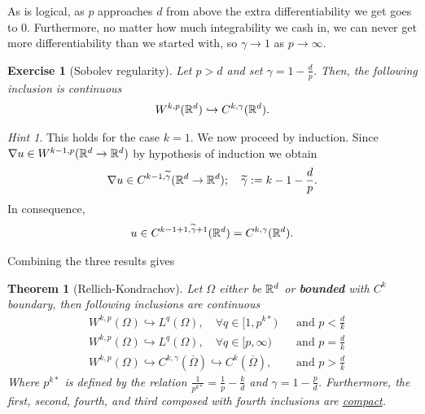 \documentclass[12pt]{article}
\newtheorem{theorem}{Theorem}
\newtheorem{exercise}{Exercise}
\theoremstyle{remark}
\newtheorem*{hint}{Hint}
\begin{document}
As is logical, as $p$ approaches  $d$ from above the extra differentiability we get goes to  $0$. Furthermore, no matter how much integrability we cash in, we can never get more differentiability than we started with, so $\gamma \to 1$ as $p \to \infty$.\begin{exercise}[Sobolev regularity]\label{est32}
	Let $p>d$ and set $\gamma=1-\frac{d}{p}$. Then, the following inclusion is continuous
	\begin{align*}
		W^{k,p}(\mathbb{R}^d) \hookrightarrow C^{k,\gamma }(\mathbb{R}^d).
	\end{align*}
\end{exercise}
\begin{hint}
	This holds for the case $k=1$. We now proceed by induction. Since $\nabla u \in W^{k-1,p}(\mathbb{R}^d \to  \mathbb{R}^d)$ by hypothesis of induction we obtain
	\begin{align*}
		\nabla u \in C^{k-1,\widetilde{\gamma }}(\mathbb{R}^d \to \mathbb{R}^d); \quad \widetilde{\gamma }:= k-1 -\frac{d}{p} .
	\end{align*}
	In consequence,
	\begin{align*}
		u \in C^{k-1+1,\widetilde{\gamma}+1}(\mathbb{R}^d )=C^{k,\gamma}(\mathbb{R}^d ) .
	\end{align*}
\end{hint}
Combining the three results gives
\begin{theorem}[Rellich-Kondrachov]\label{rellich}
	Let $\Omega$ either be $\mathbb{R}^d$ or \textbf{bounded} with $C^k$ boundary, then following  inclusions are continuous
	\begin{align*}
		 & W^{k,p}(\Omega) \hookrightarrow L^q(\Omega) ,           \quad\forall q \in [1,p^{k*})                              & \text{ and }     p<\frac{d}{k} \\
		 & W^{k,p}(\Omega) \hookrightarrow L^q(\Omega) ,           \quad\forall q \in [p,\infty)                              & \text{ and }   p=\frac{d}{k}   \\
		 & W^{k,p}(\Omega) \hookrightarrow C^{k,\gamma }(\overline{\Omega}) \hookrightarrow C^{k}(\overline{\Omega}) ,  \quad & \text{ and }  p>\frac{d}{k}\end{align*}
	Where $p^{k*}$ is defined by the relation $\frac{1}{p^{k*}}=\frac{1}{p}-\frac{k}{d}$ and $\gamma =1 -\frac{p}{d}$. Furthermore, the first, second, fourth, and third composed with fourth inclusions are \href{https://en.wikipedia.org/wiki/Compact_embedding}{compact}.
\end{theorem}
\end{document}
